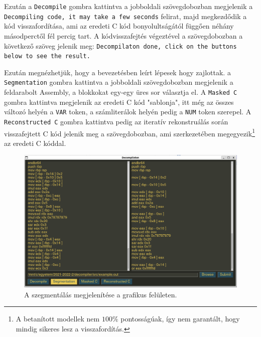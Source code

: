 Ezután a \texttt{Decompile} gombra kattintva a jobboldali szövegdobozban megjelenik
a \texttt{Decompiling code, it may take a few seconds} felirat, majd
megkezdődik a kód visszafordítása, ami az eredeti C kód bonyolultságától
függően néhány másodperctől fél percig tart. A kódvisszafejtés végeztével
a szövegdobozban a következő szöveg jelenik meg: \texttt{Decompilaton done,
click on the buttons below to see the result.}

Ezután megnézhetjük, hogy
a bevezetésben leírt lépesek hogy zajlottak. a \texttt{Segmentation} gombra
kattintva a jobboldali szövegdobozban megjelenik a feldarabolt Assembly,
a blokkokat egy-egy üres sor választja el. A \texttt{Masked C} gombra kattintva
megjelenik az eredeti C kód "sablonja", itt még az összes változó helyén
a \texttt{VAR} token, a számliterálok helyén pedig a \texttt{NUM} token
szerepel. A \texttt{Reconstructed C} gombra kattintva pedig az iteratív
rekonstruálás során visszafejtett C kód jelenik meg a szövegdobozban, ami
szerkezetében megegyezik\footnote{A betanított modellek nem $100\%$
pontosságúak, így nem garantált, hogy mindig sikeres lesz a visszafordítás.} az
eredeti C kóddal.

\begin{figure}[H]
	\centering
	\includegraphics[width=1.0\textwidth]{images/segmentation.png}
	\caption{A szegmentálás megjelenítése a grafikus felületen.}
	\label{fig:segmentation}
\end{figure}


